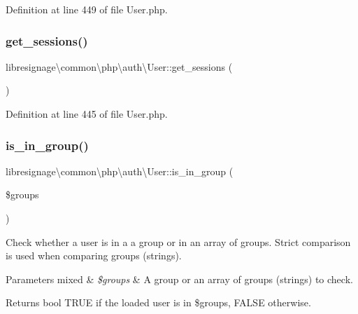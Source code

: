 Definition at line 449 of file User.\+php.

\mbox{\label{classlibresignage_1_1common_1_1php_1_1auth_1_1User_ad5123dcc183a0f7e4761b1b323c6b967}} 
\subsubsection{\texorpdfstring{get\+\_\+sessions()}{get\_sessions()}}
{\footnotesize\ttfamily libresignage\textbackslash{}common\textbackslash{}php\textbackslash{}auth\textbackslash{}\+User\+::get\+\_\+sessions (\begin{DoxyParamCaption}{ }\end{DoxyParamCaption})}



Definition at line 445 of file User.\+php.

\mbox{\label{classlibresignage_1_1common_1_1php_1_1auth_1_1User_a98764627a6fe14a59e969bd7c95995da}} 
\subsubsection{\texorpdfstring{is\+\_\+in\+\_\+group()}{is\_in\_group()}}
{\footnotesize\ttfamily libresignage\textbackslash{}common\textbackslash{}php\textbackslash{}auth\textbackslash{}\+User\+::is\+\_\+in\+\_\+group (\begin{DoxyParamCaption}\item[{}]{\$groups }\end{DoxyParamCaption})}

Check whether a user is in a a group or in an array of groups. Strict comparison is used when comparing groups (strings).


\begin{DoxyParams}[1]{Parameters}
mixed & {\em \$groups} & A group or an array of groups (strings) to check.\\
\hline
\end{DoxyParams}
\begin{DoxyReturn}{Returns}
bool T\+R\+UE if the loaded user is in \$groups, F\+A\+L\+SE otherwise.
\end{DoxyReturn}

